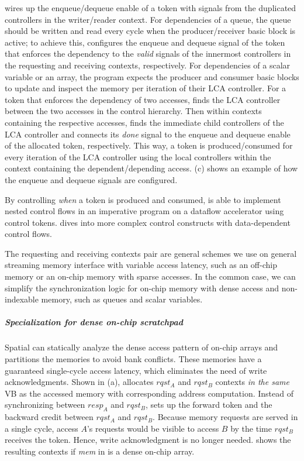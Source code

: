 \name wires up the enqueue/dequeue enable of a token with signals from the duplicated controllers 
in the writer/reader context.
For dependencies of a queue, 
the queue should be written and read every cycle when the producer/receiver basic block is active; 
to achieve this, \name configures the enqueue and dequeue signal of the token that enforces the dependency to the \emph{valid} signals of the innermost controllers in the requesting and receiving
contexts, respectively.
For dependencies of a scalar variable or an array, the program expects the producer and consumer basic blocks to update and inspect the memory per iteration of their LCA controller.
For a token that enforces the dependency of two accesses, 
\name finds the LCA controller between the two accesses in the control hierarchy.
Then within contexts containing the respective accesses, \name finds the immediate child controllers
of the LCA controller and connects its \emph{done} signal to the enqueue and dequeue enable of the allocated
token, respectively.
This way, a token is produced/consumed for every iteration of the LCA controller using the local
controllers within the context containing the dependent/depending access.
 (c) shows an example of how the enqueue and dequeue signals are configured.

By controlling \emph{when} a token is produced and consumed, \name is able to implement
nested control flows in an imperative program on a dataflow accelerator using control tokens.
 dives into more complex control constructs with 
data-dependent control flows.

The requesting and receiving contexts pair are general schemes we use on general streaming memory
interface with variable access latency, such as an off-chip memory or an on-chip memory with
sparse accesses.
In the common case, we can simplify the synchronization logic for on-chip memory with dense access and
non-indexable memory, such as queues and scalar variables.

\subparagraph{Specialization for dense on-chip scratchpad}
Spatial can statically analyze the dense access pattern of on-chip arrays and partitions the memories
to avoid bank conflicts. These memories have a guaranteed single-cycle access latency, 
which eliminates the need of write acknowledgments.
Shown in  (a),
\name allocates $rqst_A$ and $rqst_B$ contexts \emph{in the same} VB as the accessed memory with
corresponding address computation.
Instead of synchronizing between $resp_A$ and $rqst_B$, \name sets up the forward token and the
backward credit between $rqst_A$ and $rqst_B$.
Because memory requests are served in a single cycle, access $A$'s requests would be visible to
access $B$ by the time $rqst_B$ receives the token. Hence, write acknowledgment is no longer needed.
 shows the resulting contexts if \emph{mem} in  is a dense
on-chip array.

